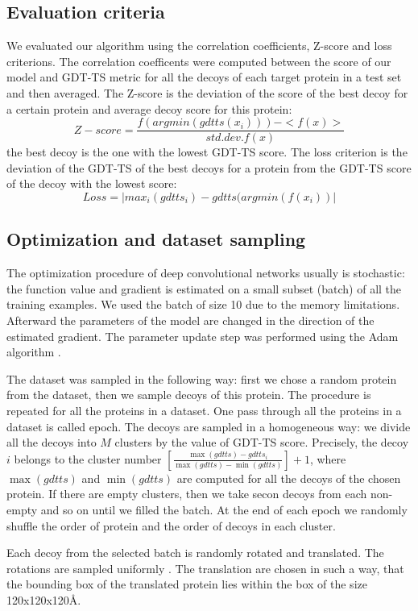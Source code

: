 \documentclass[a4paper,10pt]{article}
\begin{document}
\subsection{Evaluation criteria}
We evaluated our algorithm using the correlation coefficients, Z-score and loss criterions. The correlation coefficents 
were computed between the score of 
our model and GDT-TS metric for all the decoys of each target protein in a test set and then averaged. 
The Z-score is the deviation of the score of 
the best decoy for a certain protein and average decoy score for this protein:
$$ 
Z-score = \frac{f( argmin(gdtts(x_i)) ) - <f(x)>}{std.dev.f(x)}
$$ 
the best decoy is the one with the lowest GDT-TS score. 
The loss criterion is the deviation of the GDT-TS of the best decoys for a protein from the GDT-TS score of the decoy with the lowest score:
$$ 
Loss = | max_i( gdtts_i ) - gdtts( argmin(f(x_i) ) |
$$ 

\subsection{Optimization and dataset sampling}
The optimization procedure of deep convolutional networks usually is stochastic: the function value and gradient 
is estimated on a small subset (batch) of all the training 
examples. We used the batch of size 10 due to the memory limitations. Afterward the parameters of the model are 
changed in the direction of the estimated gradient.
The parameter update step was performed using the Adam algorithm \cite{}. 

The dataset was sampled in the following way: first we chose a random protein from the dataset, then we sample decoys of this protein. 
The procedure is repeated for all the 
proteins in a dataset. One pass through all the proteins in a dataset is called epoch. 
The decoys are sampled in a homogeneous way: we divide all the decoys into $M$ clusters by the value of GDT-TS score. 
Precisely, the decoy $i$ belongs to the cluster  
number $ \left[ \frac{\max(gdtts) - gdtts_i}{\max(gdtts) - \min(gdtts)} \right] + 1$, where $\max(gdtts)$ and $\min(gdtts)$ 
are computed for all the decoys of 
the chosen protein. If there are empty clusters, then we take secon decoys from each non-empty and so on until we filled the batch. 
At the end of each epoch we randomly
shuffle the order of protein and the order of decoys in each cluster. 

Each decoy from the selected batch is randomly rotated and translated. The rotations are sampled uniformly \cite{}. The translation are chosen
in such a way, that the bounding box of the translated protein lies within the box of the size 120x120x120\AA. 
\end{document}
